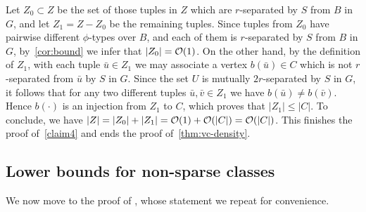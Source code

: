 \medskip
  Let $Z_0\subset Z$ be the set of 
  those tuples in $Z$ which are $r$-separated by $S$ from $B$ in $G$,
  and let $Z_1=Z-Z_0$ be the remaining  tuples.
  Since tuples from $Z_0$ have pairwise different $\phi$-types over $B$, and each of them is $r$-separated by $S$ from $B$ in $G$, by~\cref{cor:bound} we infer that $|Z_0|=\mathcal{O}(1)$.  
 On the other hand, by the definition of $Z_1$, with each tuple $\bar u\in Z_1$ we may associate a vertex $b(\bar u)\in C$ which is not $r$-separated from $\bar u$ by $S$ in $G$.
 Since the set $U$ is mutually $2r$-separated by $S$ in $G$, it follows that for any two different tuples $\bar u,\bar v\in Z_1$ we have $b(\bar u)\neq b(\bar v)$.
 Hence $b(\cdot)$ is an injection from $Z_1$ to $C$, which proves that $|Z_1|\leq |C|$.
 To conclude, we have $|Z|=|Z_0|+|Z_1|=\mathcal{O}(1)+\mathcal{O}(|C|)=\mathcal{O}(|C|)$. This finishes the proof of~\cref{claim4} and ends the proof of~\cref{thm:vc-density}.
  
\subsection{Lower bounds for non-sparse classes}
We now move to the proof of ,
whose statement we repeat for convenience.



